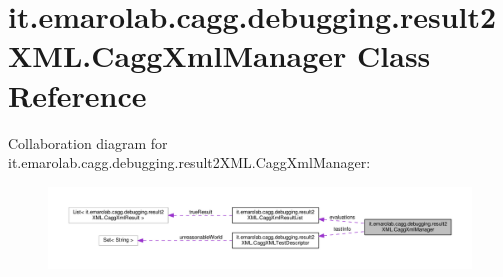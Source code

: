 \hypertarget{classit_1_1emarolab_1_1cagg_1_1debugging_1_1result2XML_1_1CaggXmlManager}{\section{it.\-emarolab.\-cagg.\-debugging.\-result2\-X\-M\-L.\-Cagg\-Xml\-Manager Class Reference}
\label{classit_1_1emarolab_1_1cagg_1_1debugging_1_1result2XML_1_1CaggXmlManager}
}


Collaboration diagram for it.\-emarolab.\-cagg.\-debugging.\-result2\-X\-M\-L.\-Cagg\-Xml\-Manager\-:\nopagebreak
\begin{figure}[H]
\begin{center}
\leavevmode
\includegraphics[width=350pt]{classit_1_1emarolab_1_1cagg_1_1debugging_1_1result2XML_1_1CaggXmlManager__coll__graph}
\end{center}
\end{figure}
